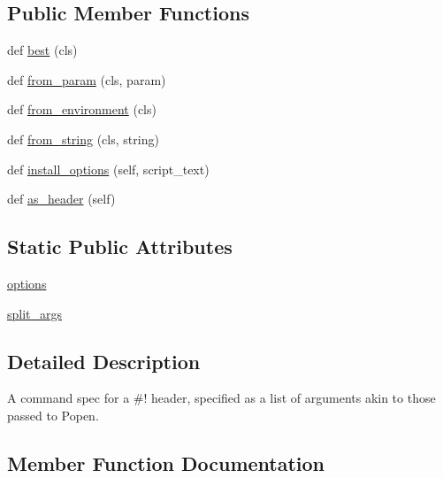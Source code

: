 \subsection*{Public Member Functions}
\begin{DoxyCompactItemize}
\item 
def \hyperlink{classsetuptools_1_1command_1_1easy__install_1_1CommandSpec_ac2ba0db896d483306a07e374489f412f}{best} (cls)
\item 
def \hyperlink{classsetuptools_1_1command_1_1easy__install_1_1CommandSpec_a07cdc7c1776648e9e7219dc9b48a4b02}{from\+\_\+param} (cls, param)
\item 
def \hyperlink{classsetuptools_1_1command_1_1easy__install_1_1CommandSpec_af4913f12e889edaf084283405069b1ae}{from\+\_\+environment} (cls)
\item 
def \hyperlink{classsetuptools_1_1command_1_1easy__install_1_1CommandSpec_a06561ebbceb860d5733127793c5896dc}{from\+\_\+string} (cls, string)
\item 
def \hyperlink{classsetuptools_1_1command_1_1easy__install_1_1CommandSpec_a039822c09205774f5c43d7dced759696}{install\+\_\+options} (self, script\+\_\+text)
\item 
def \hyperlink{classsetuptools_1_1command_1_1easy__install_1_1CommandSpec_aa60f3c4d8e0502a97722c9a91fd94594}{as\+\_\+header} (self)
\end{DoxyCompactItemize}
\subsection*{Static Public Attributes}
\begin{DoxyCompactItemize}
\item 
\hyperlink{classsetuptools_1_1command_1_1easy__install_1_1CommandSpec_af903823d2b8b78c41780cdf6268bd81e}{options}
\item 
\hyperlink{classsetuptools_1_1command_1_1easy__install_1_1CommandSpec_ad018294d1fc138784632eceabaf1aa48}{split\+\_\+args}
\end{DoxyCompactItemize}


\subsection{Detailed Description}
\begin{DoxyVerb}A command spec for a #! header, specified as a list of arguments akin to
those passed to Popen.
\end{DoxyVerb}
 

\subsection{Member Function Documentation}
\mbox{\label{classsetuptools_1_1command_1_1easy__install_1_1CommandSpec_aa60f3c4d8e0502a97722c9a91fd94594}} 
